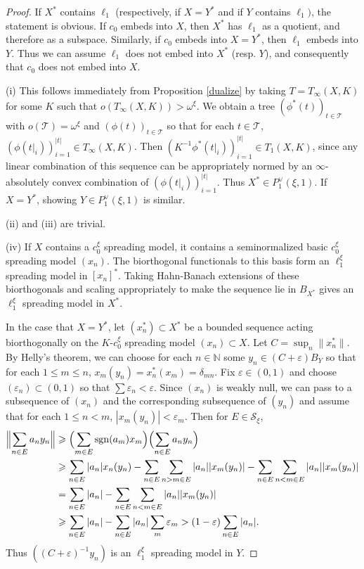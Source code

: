 \documentclass[12pt]{amsart}
\theoremstyle{definition}
\newcommand{\nn}{\mathbb{N}}
\newcommand{\ttt}{\mathcal{T}}
\newcommand{\sss}{\mathcal{S}}
\DeclareMathOperator{\sgn}{sgn}
\begin{document}
\begin{proof} If $X^*$ contains $\ell_1$ (respectively, if $X=Y^*$ and if $Y$ contains $\ell_1)$, the statement is obvious.  If $c_0$ embeds into $X$, then $X^*$ has $\ell_1$ as a quotient, and therefore as a subspace.  Similarly, if $c_0$ embeds into $X=Y^*$, then $\ell_1$ embeds into $Y$.  Thus we can assume $\ell_1$ does not embed into $X^*$ (resp. $Y$), and consequently that $c_0$ does not embed into $X$.  

(i) This follows immediately from Proposition \ref{dualize} by taking $T=T_\infty(X,K)$ for some $K$ such that $o(T_\infty(X,K))>\omega^\xi$.  We obtain a tree $(\phi^*(t))_{t\in \ttt}$ with $o(\ttt)=\omega^\xi$ and $(\phi(t))_{t\in \ttt}$ so that for each $t\in \ttt$, $(\phi(t|_i))_{i=1}^{|t|}\in T_\infty(X, K)$.  Then $(K^{-1}\phi^*(t|_i))_{i=1}^{|t|}\in T_1(X, K)$, since any linear combination of this sequence can be appropriately normed by an $\infty$-absolutely convex combination of $(\phi(t|_i))_{i=1}^{|t|}$.  Thus $X^*\in P^\vee_1(\xi, 1)$.  If $X=Y^*$, showing $Y\in P_1^\vee(\xi, 1)$ is similar.   

(ii) and (iii) are trivial.  



(iv) If $X$ contains a $c_0^\xi$ spreading model, it contains a seminormalized basic $c_0^\xi$ spreading model $(x_n)$.  The biorthogonal functionals to this basis form an $\ell_1^\xi$ spreading model in $[x_n]^*$.  Taking Hahn-Banach extensions of these biorthogonals and scaling appropriately to make the sequence lie in $B_{X^*}$ gives an $\ell_1^\xi$ spreading model in $X^*$.  

In the case that $X=Y^*$, let $(x_n^*)\subset X^*$ be a bounded sequence acting biorthogonally on the $K$-$c_0^\xi$ spreading model $(x_n)\subset X$.  Let $C=\sup_n \|x_n^*\|$.  By Helly's theorem, we can choose for each $n\in \nn$ some $y_n\in (C+\varepsilon)B_Y$ so that for each $1\leqslant m\leqslant n$, $x_m(y_n)= x_n^*(x_m)=\delta_{mn}$.  Fix $\varepsilon\in (0,1)$ and choose $(\varepsilon_n)\subset (0,1)$ so that $\sum \varepsilon_n< \varepsilon$.  Since $(x_n)$ is weakly null, we can pass to a subsequence of $(x_n)$ and the corresponding subsequence of $(y_n)$ and assume that for each $1\leqslant n<m$, $|x_m(y_n)|<\varepsilon_m$.  Then for $E\in \sss_\xi$, \begin{align*} \Bigl\|\sum_{n\in E} a_n y_n\Bigr\| & \geqslant \Bigl(\sum_{m\in E} \sgn(a_m)x_m\Bigr)\Bigl(\sum_{n\in E}a_n y_n\Bigr) \\ & \geqslant \sum_{n\in E} |a_n|x_n(y_n)- \sum_{n\in E}\sum_{n>m\in E}|a_n||x_m(y_n)| - \sum_{n\in E}\sum_{n<m\in E}|a_n||x_m(y_n)|\\ & = \sum_{n\in E}|a_n| - \sum_{n\in E}\sum_{n<m\in E}|a_n||x_m(y_n)| \\ & \geqslant \sum_{n\in E}|a_n|- \sum_{n\in E}|a_n|\sum_m \varepsilon_m > (1-\varepsilon)\sum_{n\in E}|a_n|. \end{align*}
Thus $((C+\varepsilon)^{-1}y_n)$ is an $\ell_1^\xi$ spreading model in $Y$.  


\end{proof}
\end{document}
